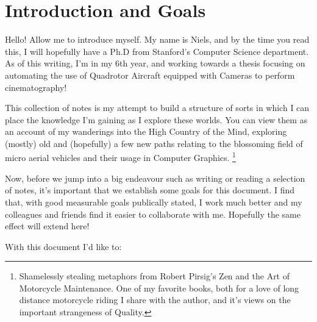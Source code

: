 \chapter{Introduction and Goals} 

Hello! Allow me to introduce myself. My name is Niels, and by the time you read this, I will hopefully have a Ph.D from Stanford's Computer Science department. As of this writing, I'm in my 6th year, and working towards a thesis focusing on automating the use of Quadrotor Aircraft equipped with Cameras to perform cinematography! 

This collection of notes is my attempt to build a structure of sorts in which I can place the knowledge I'm gaining as I explore these worlds. You can view them as an account of my wanderings into the High Country of the Mind\cite{Pirsig2005}, exploring (mostly) old and (hopefully) a few new paths relating to the blossoming field of micro aerial vehicles and their usage in Computer Graphics.  
 \footnote{Shamelessly stealing metaphors from Robert Pirsig's Zen and the Art of Motorcycle Maintenance. One of my favorite books, both for a love of long distance motorcycle riding I share with the author, and it's views on the important strangeness of Quality.}

Now, before we jump into a big endeavour such as writing or reading a selection of notes, it's important that we establish some goals for this document. I find that, with good measurable goals publically stated, I work much better and my colleagues and friends find it easier to collaborate with me. Hopefully the same effect will extend here!

With this document I'd like to:

